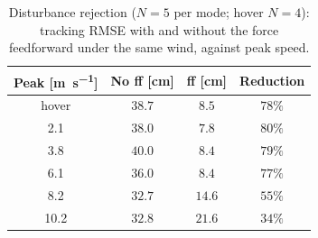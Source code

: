 \documentclass{ieeeaccess}
\begin{document}
\DIFdelbegin %

\DIFdelend \begin{table}[t]
\centering
\caption{Disturbance rejection ($N=5$ per mode; hover $N=4$): tracking RMSE with and without the force
feedforward under the same wind, against peak speed.}
\label{tab:rej}
\begin{tabular}{cccc}
\toprule
Peak [\si{\meter\per\second}] & No ff [\si{\centi\meter}] & ff [\si{\centi\meter}] & Reduction \\
\midrule
hover & $38.7$ & $8.5$  & $78\%$ \\
2.1   & $38.0$ & $7.8$  & $80\%$ \\
3.8   & $40.0$ & $8.4$  & $79\%$ \\
6.1   & $36.0$ & $8.4$  & $77\%$ \\
8.2   & $32.7$ & $14.6$ & $55\%$ \\
10.2  & $32.8$ & $21.6$ & $34\%$ \\
\bottomrule
\end{tabular}
\end{table}
\end{document}
